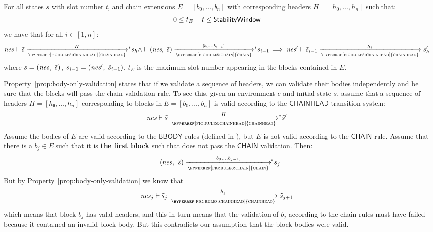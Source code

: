 \begin{property}\label{prop:body-only-validation}
  For all states $s$ with slot number $t$, and chain
  extensions $E = [b_0, \ldots, b_n]$ with corresponding headers $H = [h_0, \ldots, h_n]$ such that:
  $$
  0 \leq t_E - t  \leq \mathsf{StabilityWindow}
  $$
  we have that for all $i \in [1, n]$:
  $$
  \var{nes} \vdash \tilde{s} \transtar{\hyperref[fig:rules:chainhead]{chainhead}}{H} s_{h}
  \wedge
  \vdash (\var{nes},~\tilde{s}) \transtar{\hyperref[fig:rules:chain]{chain}}{[b_0 \ldots b_{i-1}]} s_{i-1}
  \implies
  \var{nes'} \vdash \tilde{s}_{i-1}\trans{\hyperref[fig:rules:chainhead]{chainhead}}{h_i} s'_{h}
  $$
  where $s=(\mathit{nes},~\tilde{s})$, $s_{i-1}=(\mathit{nes'},~\tilde{s}_{i-1})$,
  $t_E$ is the maximum slot number appearing in the blocks contained in $E$.
\end{property}

Property~\ref{prop:body-only-validation} states that if we validate a sequence
of headers, we can validate their bodies independently and be sure that the
blocks will pass the chain validation rule. To see this, given an environment
$e$ and initial state $s$, assume that a sequence of headers
$H = [h_0, \ldots, h_n]$ corresponding to blocks in $E = [b_0, \ldots, b_n]$ is
valid according to the $\mathsf{CHAINHEAD}$ transition system:
%
$$
\var{nes} \vdash \tilde{s} \transtar{\hyperref[fig:rules:chainhead]{chainhead}}{H} \tilde{s}'
$$
%
Assume the bodies of $E$ are valid
according to the $\mathsf{BBODY}$ rules (defined in \cite{shelley_chain_spec}), but $E$ is not valid according to
the $\mathsf{CHAIN}$ rule. Assume that there is a $b_j \in E$ such that it is
\textbf{the first block} such that does not pass the $\mathsf{CHAIN}$
validation. Then:
%
$$
\vdash (\var{nes},~\tilde{s}) \transtar{\hyperref[fig:rules:chain]{chain}}{[b_0, \ldots b_{j-1}]} s_j
$$
But by Property~\ref{prop:body-only-validation} we know that
%
$$
\var{nes}_j \vdash \tilde{s}_j \trans{\hyperref[fig:rules:chainhead]{chainhead}}{h_j} \tilde{s}_{j+1}
$$
which means that block $b_j$ has valid headers, and this in turn means that the
validation of $b_j$ according to the chain rules must have failed because it
contained an invalid block body. But this contradicts our assumption that the
block bodies were valid.

\clearpage

